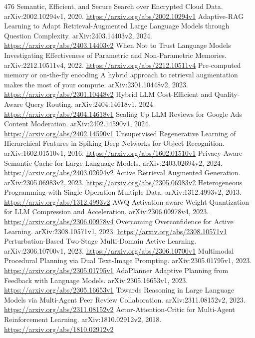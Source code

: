 \documentclass[11pt]{article}
\begin{document}
\begin{thebibliography}{476}
 Semantic, Efficient, and Secure Search over Encrypted Cloud Data. arXiv:2002.10294v1, 2020. \url{https://arxiv.org/abs/2002.10294v1}
 Adaptive-RAG Learning to Adapt Retrieval-Augmented Large Language Models through Question Complexity. arXiv:2403.14403v2, 2024. \url{https://arxiv.org/abs/2403.14403v2}
 When Not to Trust Language Models Investigating Effectiveness of Parametric and Non-Parametric Memories. arXiv:2212.10511v4, 2022. \url{https://arxiv.org/abs/2212.10511v4}
 Pre-computed memory or on-the-fly encoding A hybrid approach to retrieval augmentation makes the most of your compute. arXiv:2301.10448v2, 2023. \url{https://arxiv.org/abs/2301.10448v2}
 Hybrid LLM Cost-Efficient and Quality-Aware Query Routing. arXiv:2404.14618v1, 2024. \url{https://arxiv.org/abs/2404.14618v1}
 Scaling Up LLM Reviews for Google Ads Content Moderation. arXiv:2402.14590v1, 2024. \url{https://arxiv.org/abs/2402.14590v1}
 Unsupervised Regenerative Learning of Hierarchical Features in Spiking Deep Networks for Object Recognition. arXiv:1602.01510v1, 2016. \url{https://arxiv.org/abs/1602.01510v1}
 Privacy-Aware Semantic Cache for Large Language Models. arXiv:2403.02694v2, 2024. \url{https://arxiv.org/abs/2403.02694v2}
 Active Retrieval Augmented Generation. arXiv:2305.06983v2, 2023. \url{https://arxiv.org/abs/2305.06983v2}
 Heterogeneous Programming with Single Operation Multiple Data. arXiv:1312.4993v2, 2013. \url{https://arxiv.org/abs/1312.4993v2}
 AWQ Activation-aware Weight Quantization for LLM Compression and Acceleration. arXiv:2306.00978v4, 2023. \url{https://arxiv.org/abs/2306.00978v4}
 Overcoming Overconfidence for Active Learning. arXiv:2308.10571v1, 2023. \url{https://arxiv.org/abs/2308.10571v1}
 Perturbation-Based Two-Stage Multi-Domain Active Learning. arXiv:2306.10700v1, 2023. \url{https://arxiv.org/abs/2306.10700v1}
 Multimodal Procedural Planning via Dual Text-Image Prompting. arXiv:2305.01795v1, 2023. \url{https://arxiv.org/abs/2305.01795v1}
 AdaPlanner Adaptive Planning from Feedback with Language Models. arXiv:2305.16653v1, 2023. \url{https://arxiv.org/abs/2305.16653v1}
 Towards Reasoning in Large Language Models via Multi-Agent Peer Review Collaboration. arXiv:2311.08152v2, 2023. \url{https://arxiv.org/abs/2311.08152v2}
 Actor-Attention-Critic for Multi-Agent Reinforcement Learning. arXiv:1810.02912v2, 2018. \url{https://arxiv.org/abs/1810.02912v2}

\end{thebibliography}
\end{document}
